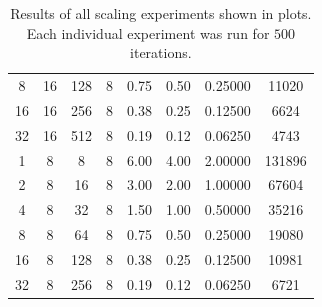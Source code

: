 \begin{table}[h!]
\begin{tabular}{||c|c|c|c|c|c|c|c||}
         8   &   16  &   128 &   8   &     0.75    &   0.50    &   0.25000 &   11020   \\
         16  &   16  &   256 &   8   &     0.38    &   0.25    &   0.12500 &   6624    \\
         32  &   16  &   512 &   8   &     0.19    &   0.12    &   0.06250 &   4743    \\
         \hline
         1   &   8   &   8   &   8   &     6.00    &   4.00    &   2.00000 &   131896  \\
         2   &   8   &   16  &   8   &     3.00    &   2.00    &   1.00000 &   67604   \\
         4   &   8   &   32  &   8   &     1.50    &   1.00    &   0.50000 &   35216   \\
         8   &   8   &   64  &   8   &     0.75    &   0.50    &   0.25000 &   19080   \\
         16  &   8   &   128 &   8   &     0.38    &   0.25    &   0.12500 &   10981   \\
         32  &   8   &   256 &   8   &     0.19    &   0.12    &   0.06250 &   6721    \\
        \hline
        \hline
    \end{tabular}
    \caption{Results of all scaling experiments shown in plots. Each individual experiment was run for $500$ iterations.}
    \label{tab:scaling_results}  
\end{table}


